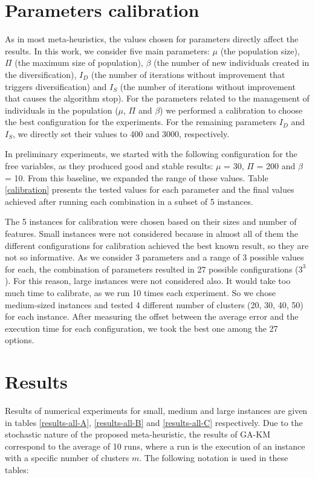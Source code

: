 

\section{Parameters calibration}
As in most meta-heuristics, the values chosen for parameters directly affect the results. In this work, we consider five main parameters: $\mu$ (the population size), $\Pi$ (the maximum size of population), $\beta$ (the number of new individuals created in the diversification), $I_D$ (the number of iterations without improvement that triggers diversification) and $I_S$ (the number of iterations without improvement that causes the algorithm stop). For the parameters related to the management of individuals in the population ($\mu$, $\Pi$ and $\beta$) we performed a calibration to choose the best configuration for the experiments. For the remaining parameters $I_D$ and $I_S$, we directly set their values to 400 and 3000, respectively.

In preliminary experiments, we started with the following configuration for the free variables, as they produced good and stable results: $\mu$ = 30, $\Pi$ = 200 and $\beta$ = 10. From this baseline, we expanded the range of these values. Table \ref{calibration} presents the tested values for each parameter and the final values achieved after running each combination in a subset of 5 instances.

The 5 instances for calibration were chosen based on their sizes and number of features. Small instances were not considered because in almost all of them the different configurations for calibration achieved the best known result, so they are not so informative. As we consider 3 parameters and a range of 3 possible values for each, the combination of parameters resulted in 27 possible configurations ($3^3$). For this reason, large instances were not considered also. It would take too much time to calibrate, as we run 10 times each experiment. So we chose medium-sized instances and tested 4 different number of clusters (20, 30, 40, 50) for each instance. After measuring the offset between the average error and the execution time for each configuration, we took the best one among the 27 options.



\section{Results}
Results of numerical experiments for small, medium and large instances are given in tables \ref{results-all-A}, \ref{results-all-B} and \ref{results-all-C} respectively. Due to the stochastic nature of the proposed meta-heuristic, the results of GA-KM correspond to the average of 10 runs, where a run is the execution of an instance with a specific number of clusters $m$. The following notation is used in these tables:

